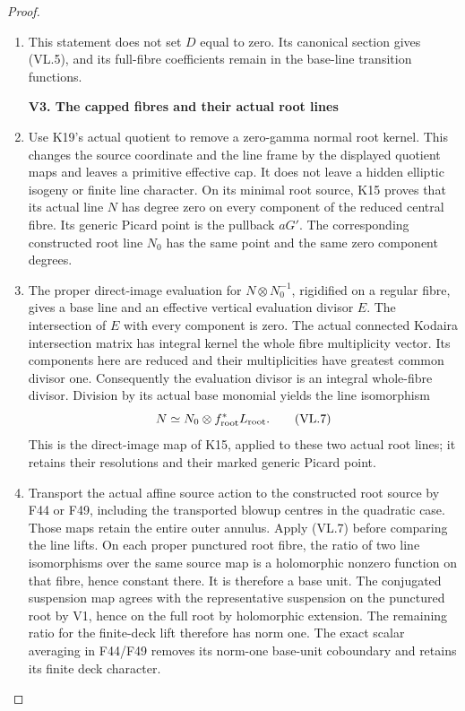 \begin{proof}
\begin{enumerate}[label=\arabic*.]
\item This statement does not set \(D\) equal to zero. Its
canonical section gives (VL.5), and its full-fibre
coefficients remain in the base-line transition functions.

\par

\medskip\noindent\textbf{V3. The capped fibres and their actual root lines}

\par\nobreak

\item Use K19's actual quotient to remove a zero-gamma normal
root kernel. This changes the source coordinate and the
line frame by the displayed quotient maps and leaves a
primitive effective cap. It does not leave a hidden
elliptic isogeny or finite line character. On its minimal
root source, K15 proves that its actual line \(N\) has
degree zero on every component of the reduced central
fibre. Its generic Picard point is the pullback \(aG'\).
The corresponding constructed root line \(N_0\) has
the same point and the same zero component degrees.

\item The proper direct-image evaluation for
\(N\otimes N_0^{-1}\), rigidified on a regular fibre,
gives a base line and an effective vertical evaluation
divisor \(E\). The intersection of \(E\) with every
component is zero. The actual connected Kodaira
intersection matrix has integral kernel the whole
fibre multiplicity vector. Its components here are
reduced and their multiplicities have greatest common
divisor one. Consequently the evaluation divisor is
an integral whole-fibre divisor. Division by its
actual base monomial yields the line isomorphism
\[
             N\simeq N_0\otimes f_{\rm root}^*L_{\rm root}.
 \tag{VL.7}
\]
This is the direct-image map of K15, applied to these
two actual root lines; it retains their resolutions
and their marked generic Picard point.

\item Transport the actual affine source action to the
constructed root source by F44 or F49, including the
transported blowup centres in the quadratic case.
Those maps retain the entire outer annulus. Apply
(VL.7) before comparing the line lifts. On each
proper punctured root fibre, the ratio of two line
isomorphisms over the same source map is a
holomorphic nonzero function on that fibre, hence
constant there. It is therefore a base unit.
The conjugated suspension map agrees with the
representative suspension on the punctured root by
V1, hence on the full root by holomorphic extension.
The remaining ratio for the finite-deck lift
therefore has norm one.
The exact scalar averaging in F44/F49 removes its
norm-one base-unit coboundary and retains its finite
deck character.


\end{enumerate}
\end{proof}
